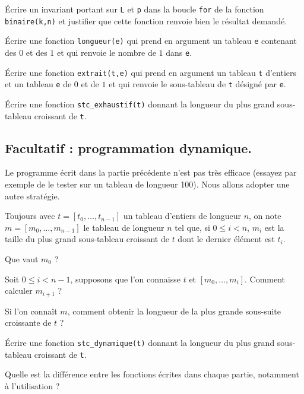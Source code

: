 \medskip{}

\question{} Écrire un invariant portant sur \texttt{L} et \texttt{p} dans la boucle \texttt{for} de la fonction \texttt{binaire(k,n)} et justifier que cette fonction renvoie bien le résultat demandé.

\medskip{}

\question{} \'Ecrire une fonction \texttt{longueur(e)} qui prend en argument un tableau \texttt{e} contenant des $0$ et des $1$ et qui renvoie le nombre de $1$ dans \texttt{e}.

\medskip{}

\question{} \'Ecrire une fonction \texttt{extrait(t,e)} qui prend en argument un tableau \texttt{t} d'entiers et un tableau \texttt{e} de $0$ et de $1$ et qui renvoie le sous-tableau de \texttt{t} désigné par \texttt{e}.

\medskip{}

\question{} \'Ecrire une fonction \texttt{stc\_exhaustif(t)} donnant la longueur du plus grand sous-tableau croissant de \texttt{t}.

\subsection{Facultatif : programmation dynamique.}

Le programme écrit dans la partie précédente n'est pas très efficace (essayez par exemple de le tester sur un tableau de longueur 100). Nous allons adopter une autre stratégie. 

Toujours avec $t = [t_0,\dots,t_{n-1}]$ un tableau d'entiers de longueur $n$, on note $m = [m_0,\dots,m_{n-1}]$ le tableau de longueur $n$ tel que, si $0\leq i < n$, $m_i$ est la taille du plus grand sous-tableau croissant de $t$ dont le dernier élément est $t_i$.



\question{} Que vaut $m_0$ ? 



\question{} Soit $0\leq i < n-1$, supposons que l'on connaisse $t$ et $[m_0,\dots,m_i]$. Comment calculer $m_{i+1}$ ? 



\question{} Si l'on connaît $m$, comment obtenir la longueur de la plus grande sous-suite croissante de $t$ ? 



\question{} \'Ecrire une fonction \texttt{stc\_dynamique(t)} donnant la longueur du plus grand sous-tableau croissant de \texttt{t}.



\question{} Quelle est la différence entre les fonctions écrites dans chaque partie, notamment à l'utilisation ? 